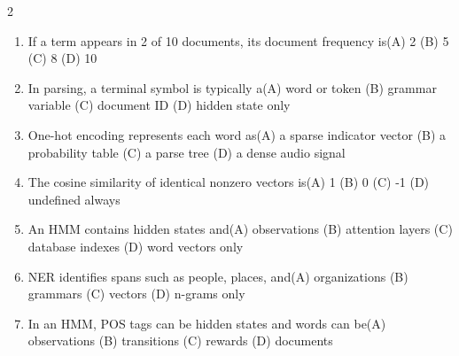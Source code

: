 \documentclass[a4paper]{article}
\begin{document}
\begin{multicols*}{2}
\begin{enumerate}[resume]
\item If a term appears in 2 of 10 documents, its document frequency is\newline\hspace*{0.6em}(A) 2 \quad (B) 5 \newline\hspace*{0.6em}(C) 8 \quad (D) 10
\item In parsing, a terminal symbol is typically a\newline\hspace*{0.6em}(A) word or token \quad (B) grammar variable \newline\hspace*{0.6em}(C) document ID \quad (D) hidden state only
\item One-hot encoding represents each word as\newline\hspace*{0.6em}(A) a sparse indicator vector \quad (B) a probability table \newline\hspace*{0.6em}(C) a parse tree \quad (D) a dense audio signal
\item The cosine similarity of identical nonzero vectors is\newline\hspace*{0.6em}(A) 1 \quad (B) 0 \newline\hspace*{0.6em}(C) -1 \quad (D) undefined always
\item An HMM contains hidden states and\newline\hspace*{0.6em}(A) observations \quad (B) attention layers \newline\hspace*{0.6em}(C) database indexes \quad (D) word vectors only
\item NER identifies spans such as people, places, and\newline\hspace*{0.6em}(A) organizations \quad (B) grammars \newline\hspace*{0.6em}(C) vectors \quad (D) n-grams only
\item In an HMM, POS tags can be hidden states and words can be\newline\hspace*{0.6em}(A) observations \quad (B) transitions \newline\hspace*{0.6em}(C) rewards \quad (D) documents

\end{enumerate}
\end{multicols*}
\end{document}
